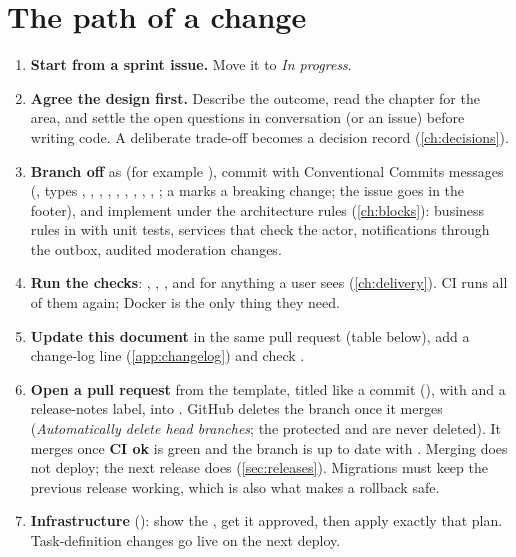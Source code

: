 \section{The path of a change}
\begin{enumerate}
  \item \textbf{Start from a sprint issue.} Move it to \emph{In progress}.
  \item \textbf{Agree the design first.} Describe the outcome, read the chapter for the area,
    and settle the open questions in conversation (or an issue) before writing code. A deliberate
    trade-off becomes a decision record (\cref{ch:decisions}).
  \item \textbf{Branch off } as  (for example
    ), commit with Conventional Commits messages
    (, types , , , ,
    , , , , , ; a \code{!}
    marks a breaking change; the issue goes in the footer), and implement under the architecture rules
    (\cref{ch:blocks}): business rules in  with unit tests, services that check the
    actor, notifications through the outbox, audited moderation changes.
  \item \textbf{Run the checks}: , ,
    , and  for anything a user sees (\cref{ch:delivery}).
    CI runs all of them again; Docker is the only thing they need.
  \item \textbf{Update this document} in the same pull request (table below), add a change-log
    line (\cref{app:changelog}) and check .
  \item \textbf{Open a pull request} from the template, titled like a commit
    (), with  and a release-notes label, into
    . GitHub deletes the branch once it merges (\emph{Automatically delete head
    branches}; the protected  and  are never deleted). It merges once \textbf{CI ok} is green and the branch is
    up to date with . Merging does not deploy; the next release does
    (\cref{sec:releases}). Migrations must keep the previous release working, which is also what
    makes a rollback safe.
  \item \textbf{Infrastructure} (): show the , get it approved,
    then apply exactly that plan. Task-definition changes go live on the next deploy.
\end{enumerate}

